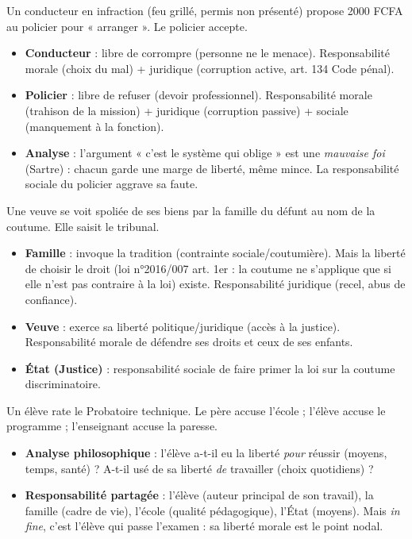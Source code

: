 \documentclass[11pt]{article}
\begin{document}
\begin{exemplebox}
Un conducteur en infraction (feu grillé, permis non présenté) propose 2000 FCFA au policier pour « arranger ». Le policier accepte.
\begin{itemize}
\item \textbf{Conducteur} : libre de corrompre (personne ne le menace). Responsabilité morale (choix du mal) + juridique (corruption active, art. 134 Code pénal).
\item \textbf{Policier} : libre de refuser (devoir professionnel). Responsabilité morale (trahison de la mission) + juridique (corruption passive) + sociale (manquement à la fonction).
\item \textbf{Analyse} : l'argument « c'est le système qui oblige » est une \emph{mauvaise foi} (Sartre) : chacun garde une marge de liberté, même mince. La responsabilité sociale du policier aggrave sa faute.
\end{itemize}
\end{exemplebox}

\begin{exemplebox}
Une veuve se voit spoliée de ses biens par la famille du défunt au nom de la coutume. Elle saisit le tribunal.
\begin{itemize}
\item \textbf{Famille} : invoque la tradition (contrainte sociale/coutumière). Mais la liberté de choisir le droit (loi n°2016/007 art. 1er : la coutume ne s'applique que si elle n'est pas contraire à la loi) existe. Responsabilité juridique (recel, abus de confiance).
\item \textbf{Veuve} : exerce sa liberté politique/juridique (accès à la justice). Responsabilité morale de défendre ses droits et ceux de ses enfants.
\item \textbf{État (Justice)} : responsabilité sociale de faire primer la loi sur la coutume discriminatoire.
\end{itemize}
\end{exemplebox}

\begin{exemplebox}
Un élève rate le Probatoire technique. Le père accuse l'école ; l'élève accuse le programme ; l'enseignant accuse la paresse.
\begin{itemize}
\item \textbf{Analyse philosophique} : l'élève a-t-il eu la liberté \emph{pour} réussir (moyens, temps, santé) ? A-t-il usé de sa liberté \emph{de} travailler (choix quotidiens) ?
\item \textbf{Responsabilité partagée} : l'élève (auteur principal de son travail), la famille (cadre de vie), l'école (qualité pédagogique), l'État (moyens). Mais \emph{in fine}, c'est l'élève qui passe l'examen : sa liberté morale est le point nodal.
\end{itemize}
\end{exemplebox}
\end{document}
